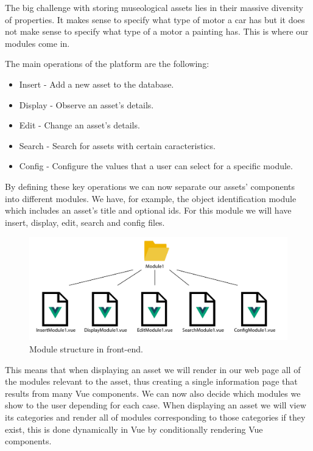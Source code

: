 The big challenge with storing museological assets lies in their massive diversity of properties. It makes sense to specify what type of motor a car has but it does not make sense to specify what type of a motor a painting has. This is where our modules come in.

The main operations of the platform are the following:

\begin{itemize}
    \item Insert - Add a new asset to the database.
    \item Display - Observe an asset's details.
    \item Edit - Change an asset's details.
    \item Search - Search for assets with certain caracteristics.
    \item Config - Configure the values that a user can select for a specific module.
\end{itemize}

By defining these key operations we can now separate our assets' components into different modules. We have, for example, the object identification module which includes an asset's title and optional ids. For this module we will have insert, display, edit, search and config files.

\begin{figure}[h!]
    \centering
    \includegraphics[scale=0.3]{images/Frontend/moduleStructure.jpg}
    \caption[Front-end module structure]{Module structure in front-end.}
    \label{moduleStructure}
\end{figure}

This means that when displaying an asset we will render in our web page all of the modules relevant to the asset, thus creating a single information page that results from many Vue components. We can now also decide which modules we show to the user depending for each case. When displaying an asset we will view its categories and render all of modules corresponding to those categories if they exist, this is done dynamically in Vue by conditionally rendering Vue components.

